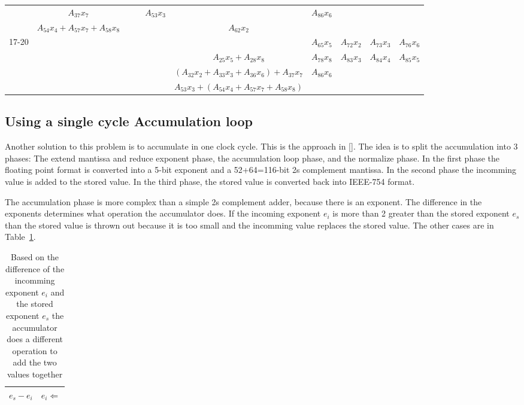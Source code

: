 \begin{sidewaystable}
\begin{tabular}{|c||c|c|c|c||c||c|c|c|c|}
        \cline{2-10}
        & $A_{37}x_7$ & & & $A_{53}x_3$ & & $A_{86}x_6$ & & & \\
        \cline{2-10}
        & $A_{54}x_4 + A_{57}x_7 + A_{58}x_8$ & & & & $A_{62}x_2$ & & & & \\
        \hline
        \hline
        \multirow{4}{*}{17-20} & & & & & & $A_{65}x_5$ & $A_{72}x_2$ & $A_{73}x_3$ & $A_{76}x_6$ \\
        \cline{2-10}
        & & & & & $A_{25}x_5 + A_{28}x_8$ & $A_{78}x_8$ & $A_{83}x_3$ & $A_{84}x_4$ & $A_{85}x_5$\\
        \cline{2-10}
        & & & & & $\left(A_{32}x_2 + A_{33}x_3 + A_{36}x_6\right) + A_{37}x_7$ & $A_{86}x_6$ & & & \\
        \cline{2-10}
        & & & & & $A_{53}x_3 + \left(A_{54}x_4 + A_{57}x_7 + A_{58}x_8\right)$ & & & & \\
        \hline


    \end{tabular}
\end{sidewaystable}

\subsection{Using a single cycle Accumulation loop}
Another solution to this problem is to accumulate in one clock cycle. This is the approach in [\cite{prelim:bachir}]. The idea is to split the accumulation into 3 phases: The extend mantissa and reduce exponent phase, the accumulation loop phase, and the normalize phase. In the first phase the floating point format is converted into a 5-bit exponent and a 52+64=116-bit 2s complement mantissa. In the second phase the incomming value is added to the stored value. In the third phase, the stored value is converted back into IEEE-754 format.

The accumulation phase is more complex than a simple 2s complement adder, because there is an exponent. The difference in the exponents determines what operation the accumulator does. If the incoming exponent $e_i$ is more than 2 greater than the stored exponent $e_s$ than the stored value is thrown out because it is too small and the incomming value replaces the stored value. The other cases are in Table~\ref{tbl:accumulator_ops}.

\begin{table}
    \caption{Based on the difference of the incomming exponent $e_i$ and the stored exponent $e_s$ the accumulator does a different operation to add the two values together}
    \label{tbl:accumulator_ops}
    \begin{tabular}{|c|c|}
        \hline
        $e_s - e_i$ & $e_i\Leftarrow$ \\
        \hline
    \end{tabular}
\end{table}


